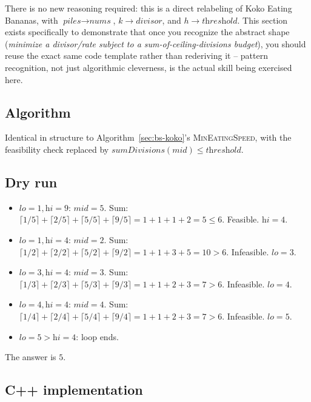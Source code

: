 There is no new reasoning required: this is a direct relabeling of
Koko Eating Bananas, with $\textit{piles} \to \textit{nums}$,
$k \to \textit{divisor}$, and $h \to \textit{threshold}$. This section
exists specifically to demonstrate that once you recognize the abstract
shape (\emph{minimize a divisor/rate subject to a sum-of-ceiling-divisions
budget}), you should reuse the exact same code template rather than
rederiving it -- pattern recognition, not just algorithmic cleverness, is
the actual skill being exercised here.

\subsection*{Algorithm}

Identical in structure to Algorithm~\ref{sec:bs-koko}'s
\textsc{MinEatingSpeed}, with the feasibility check replaced by
$\textit{sumDivisions}(\textit{mid}) \le \textit{threshold}$.

\subsection*{Dry run}


\begin{itemize}
  \item $\textit{lo}=1,\textit{hi}=9$: $\textit{mid}=5$. Sum:
        $\lceil1/5\rceil+\lceil2/5\rceil+\lceil5/5\rceil+\lceil9/5\rceil
        =1+1+1+2=5 \le 6$. Feasible. $\textit{hi}=4$.
  \item $\textit{lo}=1,\textit{hi}=4$: $\textit{mid}=2$. Sum:
        $\lceil1/2\rceil+\lceil2/2\rceil+\lceil5/2\rceil+\lceil9/2\rceil
        =1+1+3+5=10 > 6$. Infeasible. $\textit{lo}=3$.
  \item $\textit{lo}=3,\textit{hi}=4$: $\textit{mid}=3$. Sum:
        $\lceil1/3\rceil+\lceil2/3\rceil+\lceil5/3\rceil+\lceil9/3\rceil
        =1+1+2+3=7 > 6$. Infeasible. $\textit{lo}=4$.
  \item $\textit{lo}=4,\textit{hi}=4$: $\textit{mid}=4$. Sum:
        $\lceil1/4\rceil+\lceil2/4\rceil+\lceil5/4\rceil+\lceil9/4\rceil
        =1+1+2+3=7 > 6$. Infeasible. $\textit{lo}=5$.
  \item $\textit{lo}=5 > \textit{hi}=4$: loop ends.
\end{itemize}

The answer is $5$.

\subsection*{C++ implementation}

